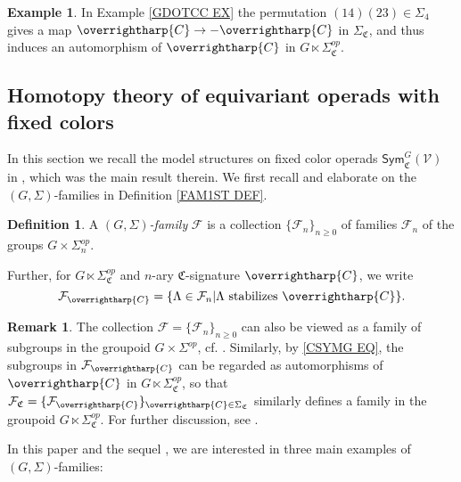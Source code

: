 \documentclass[a4paper,10pt
,draft
]{article}%
\numberwithin{equation}{section}
\numberwithin{figure}{section}
\theoremstyle{definition} %
\newtheorem{definition}[equation]{Definition}%
\newtheorem{example}[equation]{Example}%
\newtheorem{remark}[equation]{Remark}%
\newcommand{\vect}[1]{\text{\overrightharp{\ensuremath{#1}}}}
\newcommand{\F}{\ensuremath{\mathcal F}}
\newcommand{\V}{\ensuremath{\mathcal V}}
\newcommand{\1}{\ensuremath{\mathbbm 1}}%
\begin{document}
\begin{example}
In Example \ref{GDOTCC EX}
the permutation $(14)(23) \in \Sigma_4$
gives a map $\vect{C} \to -\vect{C}$ in $\Sigma_{\mathfrak{C}}$,
and thus induces an automorphism of
$\vect{C}$ in $G \ltimes \Sigma_{\mathfrak{C}}^{op}$.
\end{example}





\subsection{Homotopy theory of equivariant operads with fixed colors}\label{COLFIXMOD SEC}

In this section we recall the model structures on fixed color operads 
$\mathsf{Sym}^G_{\mathfrak{C}}(\V)$
in 
\cite[Thm. \ref{OC-THMI}]{BP_FCOP},
which was the main result therein.
%
We first recall and elaborate on the $(G,\Sigma)$-families in Definition \ref{FAM1ST DEF}.

\begin{definition}\label{GSFAM_DEF}
	A \emph{$(G,\Sigma)$-family} $\mathcal{F}$ is 
	a collection $\{\mathcal{F}_n\}_{n \geq 0}$ of families $\F_n$ of the groups 
	$G \times \Sigma_n^{op}$.
	
	Further, for $G \ltimes \Sigma^{op}_{\mathfrak{C}}$
	and $n$-ary $\mathfrak{C}$-signature $\vect{C}$,
	we write
	\begin{equation}\label{FVECTC EQ}
	\mathcal{F}_{\vect{C}} =
	\{\Lambda \in \mathcal{F}_n|
	\Lambda \text{ stabilizes } \vect{C}\}.
	\end{equation}
\end{definition}

\begin{remark}
	The collection $\mathcal{F} = \{\mathcal{F}_n\}_{n \geq 0}$
	can also be viewed as a family of subgroups
	in the groupoid $G \times \Sigma^{op}$,
	cf. \cite[Def. \ref{OC-FAMGROUPOID DEF}]{BP_FCOP}.
	Similarly,
	by \eqref{CSYMG EQ},
	the subgroups in $\mathcal{F}_{\vect{C}}$
	can be regarded as automorphisms of $\vect{C}$
	in $G \ltimes \Sigma^{op}_{\mathfrak{C}}$,
	so that
	$\mathcal{F}_{\mathfrak{C}}
	=\{ \mathcal{F}_{\vect{C}}\}_{\vect{C} \in \Sigma_{\mathfrak{C}}}$
	similarly defines a family in the groupoid
	$G \ltimes \Sigma^{op}_{\mathfrak{C}}$.
	For further discussion,
	see \cite[Def. \ref{OC-GSFAM_DEF} and Rem. \ref{OC-FAMC_DEF_EQ}]{BP_FCOP}.
\end{remark}


In this paper and the sequel \cite{BP_TAS}, 
we are interested in three main examples of $(G,\Sigma)$-families:
\end{document}
